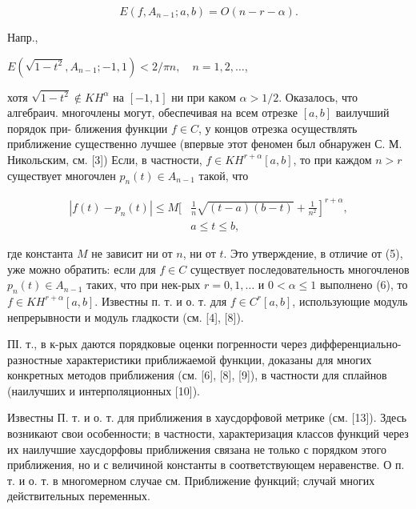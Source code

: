 \documentclass[10pt]{article}
\begin{document}
\[

E\left(f, A_{n-1} ; a, b\right)=O(n-r-\alpha) .

\]



Напр.,



$E\left(\sqrt{1-t^{2}}, A_{n-1} ;-1,1\right)<2 / \pi n, \quad n=1,2, \ldots$,



хотя $\sqrt{1-t^{2}} \notin K H^{\alpha}$ на $[-1,1]$ ни при каком $\alpha>1 / 2$. Оказалось, что алгебраич. многочлены могут, обеспечивая на всем отрезке $[a, b]$ ваилучший порядок при- ближения функции $f \in C$, у концов отрезка осуществлять приближение существенно лучшее (впервые этот феномен был обнаружен С. М. Никольским, см. [3]) Если, в частности, $f \in K H^{r+\alpha}[a, b]$, то при каждом $n>r$ существует многочлен $p_{n}(t) \in A_{n-1}$ такой, что



\[

\begin{aligned}

\left|f(t)-p_{n}(t)\right| \leqslant M[ & \left.\frac{1}{n} \sqrt{(t-a)(b-t)}+\frac{1}{n^{2}}\right]^{r+\alpha}, \\

& a \leqslant t \leqslant b,

\end{aligned}

\]



где константа $M$ не зависит ни от $n$, ни от $t$. Это утверждение, в отличие от (5), уже можно обратить: если для $f \in C$ существует последовательность многочленов $p_{n}(t) \in A_{n-1}$ таких, что при нек-рых $r=0,1, \ldots$ и $0<\alpha \leqslant 1$ выполнено (6), то $f \in K H^{r+\alpha}[a, b]$. Известны п. т. и о. т. для $f \in C^{r}[a, b]$, использующие модуль непрерывности и модуль гладкости (см. [4], [8]).



ПІ. т., в к-рых даются порядковые оценки погренности через дифференциально-разностные характеристики приближаемой функции, доказаны для многих конкретных методов приближения (см. [6], [8], [9]), в частности для сплайнов (наилучших и интерполяционных [10]).



Известны П. т. и о. т. для приближения в хаусдорфовой метрике (см. [13]). Здесь возникают свои особенности; в частности, характеризация классов функций через их наилучшие хаусдорфовы приближения связана не только с порядком этого приближения, но и с величиной константы в соответствующем неравенстве. О п. т. и о. т. в многомерном случае см. Приближение функций; случай многих действительных переменных.
\end{document}
